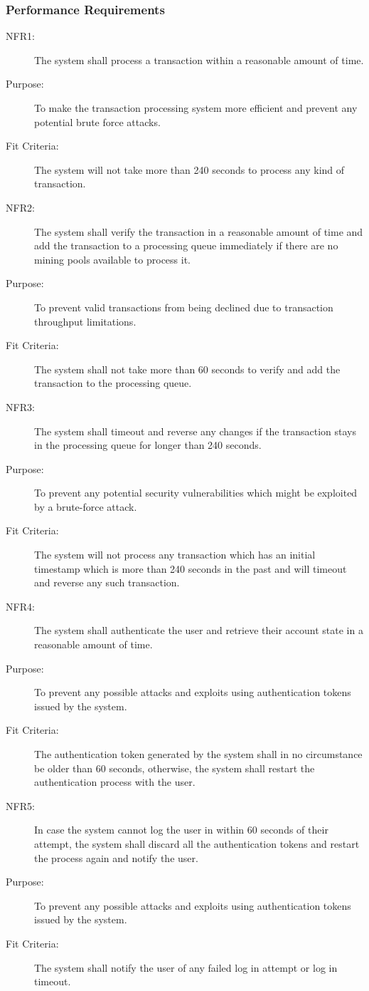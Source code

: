 \documentclass[a4paper,twoside,phd]{BYUPhys}
\begin{document}
\subsubsection{Performance Requirements}
\begin{description}
\item[NFR1:] The system shall process a transaction within a reasonable amount of time.
\item[Purpose:] To make the transaction processing system more efficient and prevent any potential brute force attacks.
\item[Fit Criteria:] The system will not take more than 240 seconds to process any kind of transaction.
\item[NFR2:] The system shall verify the transaction in a reasonable amount of time and add the  transaction  to  a  processing  queue  immediately  if  there  are  no  mining  pools available to process it.
\item[Purpose:] To prevent valid transactions from being declined due to transaction throughput limitations.
\item[Fit Criteria:] The system shall not take more than 60 seconds to verify and add the transaction to the processing queue.
\item[NFR3:] The system shall timeout and reverse any changes if the transaction stays in the processing queue for longer than 240 seconds.
\item[Purpose:] To prevent any potential security vulnerabilities which might be exploited by a brute-force attack.
\item[Fit Criteria:] The system will not process any transaction which has an initial timestamp which is more than 240 seconds in the past and will timeout and reverse any such transaction.
\item[NFR4:] The  system  shall  authenticate  the  user  and  retrieve  their  account  state in a reasonable amount of time.
\item[Purpose:] To prevent any possible attacks and exploits using authentication tokens issued by the system.
\item[Fit Criteria:] The authentication token generated by the system shall in no circumstance be older than 60 seconds, otherwise, the system shall restart the authentication process with the user.
\item[NFR5:] In case the system cannot log the user in within 60 seconds of their attempt, the system shall discard all the authentication tokens and restart the process again and notify the user.
\item[Purpose:] To prevent any possible attacks and exploits using authentication tokens issued by the system.
\item[Fit Criteria:] The system shall notify the user of any failed log in attempt or log in timeout.
\end{description}
\end{document}
